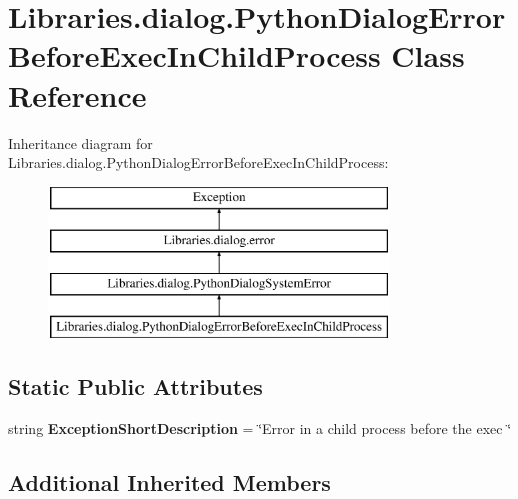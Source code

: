 \hypertarget{class_libraries_1_1dialog_1_1_python_dialog_error_before_exec_in_child_process}{}\section{Libraries.\+dialog.\+Python\+Dialog\+Error\+Before\+Exec\+In\+Child\+Process Class Reference}
\label{class_libraries_1_1dialog_1_1_python_dialog_error_before_exec_in_child_process}
Inheritance diagram for Libraries.\+dialog.\+Python\+Dialog\+Error\+Before\+Exec\+In\+Child\+Process\+:\begin{figure}[H]
\begin{center}
\leavevmode
\includegraphics[height=4.000000cm]{class_libraries_1_1dialog_1_1_python_dialog_error_before_exec_in_child_process}
\end{center}
\end{figure}
\subsection*{Static Public Attributes}
\begin{DoxyCompactItemize}
\item 
string {\bfseries Exception\+Short\+Description} = \char`\"{}Error in a child process before the exec \char`\"{}\hypertarget{class_libraries_1_1dialog_1_1_python_dialog_error_before_exec_in_child_process_a8e54ddef45bfe2aab1f81d1fcb3a4618}{}\label{class_libraries_1_1dialog_1_1_python_dialog_error_before_exec_in_child_process_a8e54ddef45bfe2aab1f81d1fcb3a4618}

\end{DoxyCompactItemize}
\subsection*{Additional Inherited Members}


